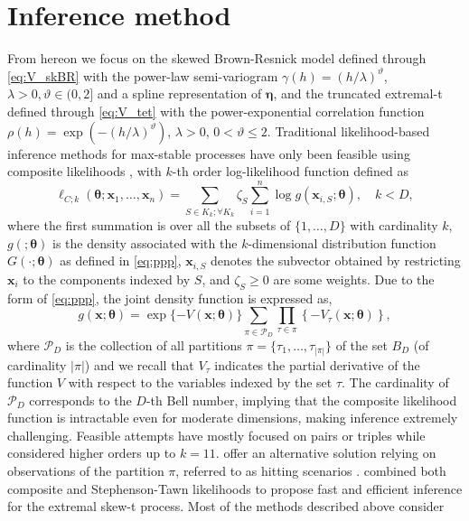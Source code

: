 \documentclass[lineno]{biometrika}
\begin{document}
\section{Inference method} %
\label{sec:inference} %

From hereon we focus on the skewed Brown-Resnick model defined through \eqref{eq:V_skBR} with the power-law semi-variogram $\gamma(h) = (h/\lambda)^\vartheta$, $\lambda>0, \vartheta \in (0,2]$ and a spline representation of $\bm \eta$, and the truncated extremal-t defined through \eqref{eq:V_tet} with the power-exponential correlation function $\rho(h) = \exp(-(h/\lambda)^\vartheta)$, $\lambda>0$, $0 < \vartheta \leq 2$. 
Traditional likelihood-based inference methods for max-stable processes have only been feasible using composite likelihoods \citep{Padoan.etal:2010,Castruccio.etal:2016}, with $k$-th order log-likelihood function defined as
\begin{equation}
\label{eq:composite}
\ell_{C;k}(\bm \theta;\bm x_1,\dots,\bm x_n)=\sum_{S \in K_k; \forall K_k} \zeta_S \sum_{i=1}^n\log g(\bm x_{i,S};\bm \theta), \quad k< D,
\end{equation}
where the first summation is over all the subsets of $\{1,\ldots,D\}$ with cardinality $k$, $g(;\bm \theta)$ is the density associated with the $k$-dimensional distribution function $G(\cdot; \bm \theta)$ as defined in \eqref{eq:ppp}, $\bm x_{i,S}$ denotes the subvector obtained by restricting $\bm x_i$ to the components indexed by $S$, and $\zeta_S \geq 0$ are some weights. Due to the form of \eqref{eq:ppp}, the joint density function is expressed as,
\begin{equation*}
\label{eq:densitymaxstable}
    g(\bm x;\bm{\theta})=\exp\{-V(\bm x;\bm\theta)\}\sum_{\pi\in \mathcal P_D}\prod_{\tau\in \pi}\left\{-V_\tau(\bm x;\bm \theta)\right\},
\end{equation*} 
where $\mathcal P_D$ is the collection of all partitions $\pi=\{\tau_1,\ldots,\tau_{|\pi|}\}$ of the set $B_D$ (of cardinality $|\pi|$) and we recall that $V_\tau$ indicates the partial derivative of the function $V$ with respect to the variables indexed by the set $\tau$. The cardinality of $\mathcal P_D$ corresponds to the $D$-th Bell number, implying that the composite likelihood function is intractable even for moderate dimensions, making inference extremely challenging. Feasible attempts have mostly focused on pairs or triples \citep{Padoan.etal:2010, Huser.Davison:2013a} while \citet{Castruccio.etal:2016} considered higher orders up to $k=11$. \citet{Stephenson.Tawn:2005} offer an alternative solution relying on observations of the partition $\pi$, referred to as hitting scenarios \citep[see also][]{Wadsworth.Tawn:2014}. \citet{Beranger.etal:2021} combined both composite and Stephenson-Tawn likelihoods to propose fast and efficient inference for the extremal skew-t process. Most of the methods described above consider
\end{document}
